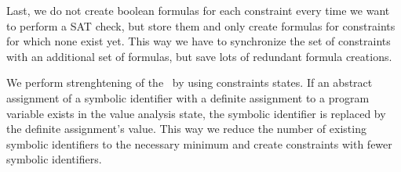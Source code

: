 
Last, we do not create boolean formulas for each constraint every time we want to perform a SAT check, but store them and only create formulas for constraints for which none exist yet.
This way we have to synchronize the set of constraints with an additional set of formulas, but save lots of redundant formula creations.

We perform strenghtening of the \ by using constraints states.
If an abstract assignment of a symbolic identifier with a definite assignment to a program variable exists in the value analysis state, the symbolic identifier is replaced by the definite assignment's value. This way we reduce the number of existing symbolic identifiers to the necessary minimum and create constraints with fewer symbolic identifiers.
